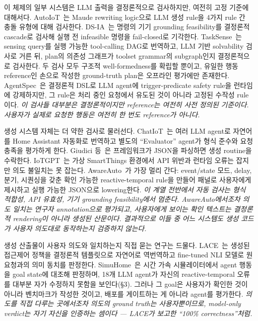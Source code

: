 \documentclass[sigconf,nonacm,anonymous,review]{acmart}
\begin{document}
이 체제의 일부 시스템은 LLM 출력을 결정론적으로 검사하지만, 여전히 고정 기준에 대해서다. AutoIoT~\cite{autoiot_maude}는 Maude rewriting logic으로 LLM 생성 rule을 4가지 rule 간 충돌 유형에 대해 검사한다. DS-IA~\cite{dsia}는 명령의 기기 grounding feasibility를 결정론적 cascade로 검사해 실행 전 infeasible 명령을 fail-closed로 기각한다. TaskSense~\cite{tasksense}는 sensing query를 실행 가능한 tool-calling DAG로 번역하고, LLM 기반 solvability 검사로 거른 뒤, plan의 의존성 그래프가 toolset grammar의 subgraph인지 결정론적으로 검사한다. 두 검사 모두 구조적 well-formedness를 확립할 뿐이고, 유일한 행동 reference인 손으로 작성한 ground-truth plan은 오프라인 평가에만 존재한다. AgentSpec~\cite{agentspec}은 결정론적 DSL로 LLM agent에 trigger-predicate safety rule을 런타임에 강제하지만, 그 rule은 처리 중인 요청에서 유도된 것이 아니라 고정된 수작성 rule이다. \emph{이 검사들 대부분은 결정론적이지만 reference는 여전히 사전 정의된 기준이다. 사용자가 실제로 요청한 행동은 여전히 한 번도 reference가 아니다.}

생성 시스템 자체는 더 약한 검사로 물러선다. ChatIoT~\cite{chatiot}는 여러 LLM agent로 자연어를 Home Assistant 자동화로 번역하고 별도의 ``Evaluator'' agent가 형식 준수와 요청 충족을 평가하게 한다. Giudici 등~\cite{giudici2025}은 프레임워크가 JSON을 파싱하면 생성 routine을 수락한다. IoTGPT~\cite{iotgpt}는 가상 SmartThings 환경에서 API 위반과 런타임 오류는 잡지만 의도 불일치는 못 잡는다. AwareAuto~\cite{awareauto}가 가장 멀리 간다: event/state 모드, delay, 분기, 시퀀싱을 갖춘 확인 가능한 reactive-temporal rule을 만들어 패널로 사용자에게 제시하고 실행 가능한 JSON으로 lowering한다. \emph{이 계열 전반에서 자동 검사는 형식 적합성, API 유효성, 기기 grounding feasibility에서 멈춘다. AwareAuto에서조차 의도 일치는 연구자 annotation으로 평가되고, 사용자에게 보이는 확인 텍스트는 결정론적 rendering이 아니라 생성된 산문이다. 결과적으로 이들 중 어느 시스템도 생성 코드가 사용자 의도대로 동작하는지 검증하지 않는다.}

생성 산출물이 사용자 의도와 일치하는지 직접 묻는 연구는 드물다. LACE~\cite{lace}는 생성된 접근제어 정책을 결정론적 템플릿으로 자연어로 역번역하고 fine-tuned NLI 모델로 원 요청과의 의미 동치를 판정한다. SimuHome~\cite{simuhome}은 시간 가속 시뮬레이터에서 agent 행동을 goal state에 대조해 판정하며, 18개 LLM agent가 자신의 reactive-temporal 오류를 대부분 자가 수정하지 못함을 보인다(\S3). 그러나 그 goal은 사용자가 확인한 것이 아니라 벤치마크가 작성한 것이고, 배포를 게이트하는 게 아니라 agent를 평가한다. \emph{의도를 직접 다루는 곳에서조차 의도의 ground truth는 사용자뿐이므로, model-only verdict는 자기 자신을 인증하는 셈이다 — LACE가 보고한 ``100\% correctness''처럼.}
\end{document}
